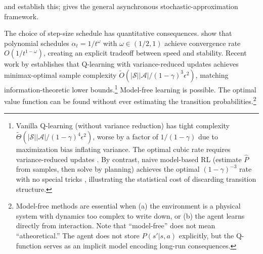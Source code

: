 \citet{WatkinsDayan1992} and \citet{jaakkola1994} establish this; \citet{tsitsiklis1994} gives the general asynchronous stochastic-approximation framework.

The choice of step-size schedule has quantitative consequences. \citet{evendar2003} show that polynomial schedules $\alpha_t = 1/t^\omega$ with $\omega \in (1/2, 1)$ achieve convergence rate $O(1/t^{1-\omega})$, creating an explicit tradeoff between speed and stability. Recent work by \citet{li2024minimax} establishes that Q-learning with variance-reduced updates achieves minimax-optimal sample complexity $\tilde{O}(|\mathcal{S}||\mathcal{A}|/(1-\gamma)^3\epsilon^2)$, matching information-theoretic lower bounds.\footnote{Vanilla Q-learning (without variance reduction) has tight complexity $\tilde{\Theta}(|\mathcal{S}||\mathcal{A}|/(1-\gamma)^4\epsilon^2)$, worse by a factor of $1/(1-\gamma)$ due to maximization bias inflating variance. The optimal cubic rate requires variance-reduced updates \citep{wainwright2019,sidford2018}. By contrast, naive model-based RL (estimate $\hat{P}$ from samples, then solve by planning) achieves the optimal $(1-\gamma)^{-3}$ rate with no special tricks \citep{agarwalKakadeYang2020}, illustrating the statistical cost of discarding transition structure.} Model-free learning is possible. The optimal value function can be found without ever estimating the transition probabilities.\footnote{Model-free methods are essential when (a) the environment is a physical system with dynamics too complex to write down, or (b) the agent learns directly from interaction. Note that ``model-free'' does not mean ``atheoretical.'' The agent does not store $P(s'|s,a)$ explicitly, but the Q-function serves as an implicit model encoding long-run consequences.}

